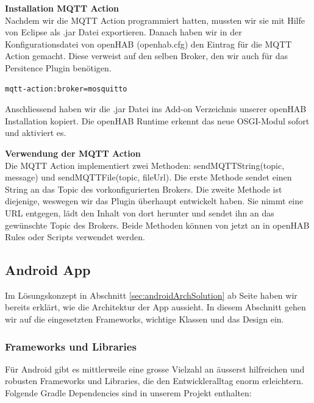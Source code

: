 \textbf{Installation MQTT Action}\\
Nachdem wir die MQTT Action programmiert hatten, mussten wir sie mit Hilfe von Eclipse als .jar Datei exportieren. Danach haben wir in der Konfigurationsdatei von openHAB (openhab.cfg) den Eintrag für die MQTT Action gemacht. Diese verweist auf den selben Broker, den wir auch für das Persitence Plugin benötigen.


\begin{lstlisting}[style=csharp, caption=openhab.cfg]
mqtt-action:broker=mosquitto
\end{lstlisting}

Anschliessend haben wir die .jar Datei ins Add-on Verzeichnis unserer openHAB Installation kopiert. Die openHAB Runtime erkennt das neue OSGI-Modul sofort und aktiviert es.

\textbf{Verwendung der MQTT Action}\\
Die MQTT Action implementiert zwei Methoden: sendMQTTString(topic, message) und sendMQTTFile(topic, fileUrl). Die erste Methode sendet einen String an das Topic des vorkonfigurierten Brokers. Die zweite Methode ist diejenige, weswegen wir das Plugin überhaupt entwickelt haben. Sie nimmt eine URL entgegen, lädt den Inhalt von dort herunter und sendet ihn an das gewünschte Topic des Brokers. Beide Methoden können von jetzt an in openHAB Rules oder Scripts verwendet werden.

\subsection{Android App}
Im Lösungskonzept in Abschnitt \ref{sec:androidArchSolution} ab Seite \pageref{sec:androidArchSolution} haben wir bereits erklärt, wie die Architektur der App aussieht. In diesem Abschnitt gehen wir auf die eingesetzten Frameworks, wichtige Klassen und das Design ein.

\subsubsection{Frameworks und Libraries}
Für Android gibt es mittlerweile eine grosse Vielzahl an äusserst hilfreichen und robusten Frameworks und Libraries, die den Entwickleralltag enorm erleichtern. Folgende Gradle Dependencies sind in unserem Projekt enthalten:

